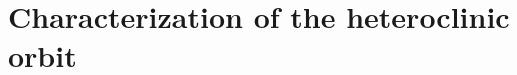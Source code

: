 \documentclass[a4paper,11pt]{article}
\begin{document}
% 
% 

\section{Characterization of the heteroclinic orbit}
\end{document}
